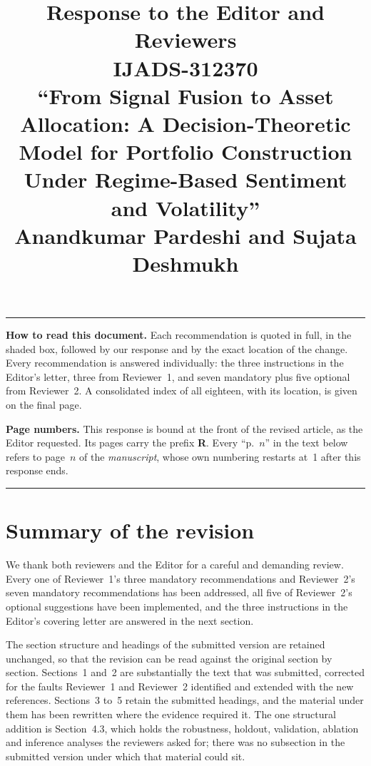 \documentclass[11pt,a4paper]{article}
\title{\vspace{-2.4cm}Response to the Editor and Reviewers\\[6pt]
\large IJADS-312370\\[2pt]
\normalsize ``From Signal Fusion to Asset Allocation: A Decision-Theoretic Model for
Portfolio Construction Under Regime-Based Sentiment and Volatility''\\[4pt]
\normalsize Anandkumar Pardeshi and Sujata Deshmukh}
\author{}
\date{}
\begin{document}
\maketitle
\vspace{-2.4cm}

\noindent\rule{\linewidth}{0.4pt}
\smallskip

\noindent\textbf{How to read this document.} Each recommendation is quoted in full, in the
shaded box, followed by our response and by the exact location of the change. Every
recommendation is answered individually: the three instructions in the Editor's letter,
three from Reviewer~1, and seven mandatory plus five optional from Reviewer~2.
A consolidated index of all eighteen, with its location, is given on the final page.

\noindent\textbf{Page numbers.} This response is bound at the front of the revised
article, as the Editor requested. Its pages carry the prefix \textbf{R}. Every
``p.~$n$'' in the text below refers to page~$n$ of the \emph{manuscript}, whose own
numbering restarts at~1 after this response ends.

\smallskip
\noindent\rule{\linewidth}{0.4pt}

\section*{Summary of the revision}

We thank both reviewers and the Editor for a careful and demanding review. Every one of
Reviewer~1's three mandatory recommendations and Reviewer~2's seven mandatory
recommendations has been addressed, all five of Reviewer~2's optional suggestions have
been implemented, and the three instructions in the Editor's covering letter are answered
in the next section.

The section structure and headings of the submitted version are retained unchanged, so
that the revision can be read against the original section by section. Sections~1 and~2
are substantially the text that was submitted, corrected for the faults Reviewer~1 and
Reviewer~2 identified and extended with the new references. Sections~3 to~5 retain the
submitted headings, and the material under them has been rewritten where the evidence
required it. The one structural addition is Section~4.3, which holds the robustness,
holdout, validation, ablation and inference analyses the reviewers asked for; there was no
subsection in the submitted version under which that material could sit.
\end{document}
